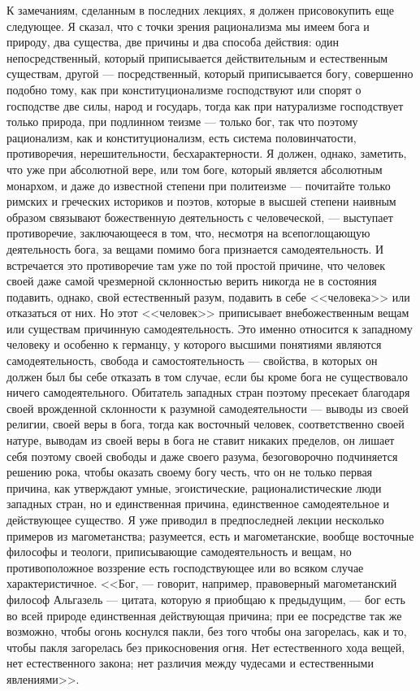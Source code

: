 \documentclass[12pt]{article}
\begin{document}
К замечаниям, сделанным в последних лекциях, я должен присовокупить еще следующее. Я сказал, что с точки зрения рационализма мы имеем бога и природу, два существа, две причины и два способа действия: один непосредственный, который приписывается действительным и естественным существам, другой --- посредственный, который приписывается богу, совершенно подобно тому, как при конституционализме господствуют или спорят о господстве две силы, народ и государь, тогда как при натурализме господствует только природа, при подлинном теизме --- только бог, так что поэтому рационализм, как и конституционализм, есть система половинчатости, противоречия, нерешительности, бесхарактерности. Я должен, однако, заметить, что уже при абсолютной вере, или том боге, который является абсолютным монархом, и даже до известной степени при политеизме --- почитайте только римских и греческих историков и поэтов, которые в высшей степени наивным образом связывают божественную деятельность с человеческой, --- выступает противоречие, заключающееся в том, что, несмотря на всепоглощающую деятельность бога, за вещами помимо бога признается самодеятельность. И встречается это противоречие там уже по той простой причине, что человек своей даже самой чрезмерной склонностью верить никогда не в состояния подавить, однако, свой естественный разум, подавить в себе <<человека>> или отказаться от них. Но этот <<человек>> приписывает внебожественным вещам или существам причинную самодеятельность. Это именно относится к западному человеку и особенно к германцу, у которого высшими понятиями являются самодеятельность, свобода и самостоятельность --- свойства, в которых он должен был бы себе отказать в том случае, если бы кроме бога не существовало ничего самодеятельного. Обитатель западных стран поэтому пресекает благодаря своей врожденной склонности к разумной самодеятельности --- выводы из своей религии, своей веры в бога, тогда как восточный человек, соответственно своей натуре, выводам из своей веры в бога не ставит никаких пределов, он лишает себя поэтому своей свободы и даже своего разума, безоговорочно подчиняется решению рока, чтобы оказать своему богу честь, что он не только первая причина, как утверждают умные, эгоистические, рационалистические люди западных стран, но и единственная причина, единственное самодеятельное и действующее существо. Я уже приводил в предпоследней лекции несколько примеров из магометанства; разумеется, есть и магометанские, вообще восточные философы и теологи, приписывающие самодеятельность и вещам, но противоположное воззрение есть господствующее или во всяком случае характеристичное. <<Бог, --- говорит, например, правоверный магометанский философ Альгазель --- цитата, которую я приобщаю к предыдущим, --- бог есть во всей природе единственная действующая причина; при ее посредстве так же возможно, чтобы огонь коснулся пакли, без того чтобы она загорелась, как и то, чтобы пакля загорелась без прикосновения огня. Нет естественного хода вещей, нет естественного закона; нет различия между чудесами и естественными явлениями>>. 
\end{document}
